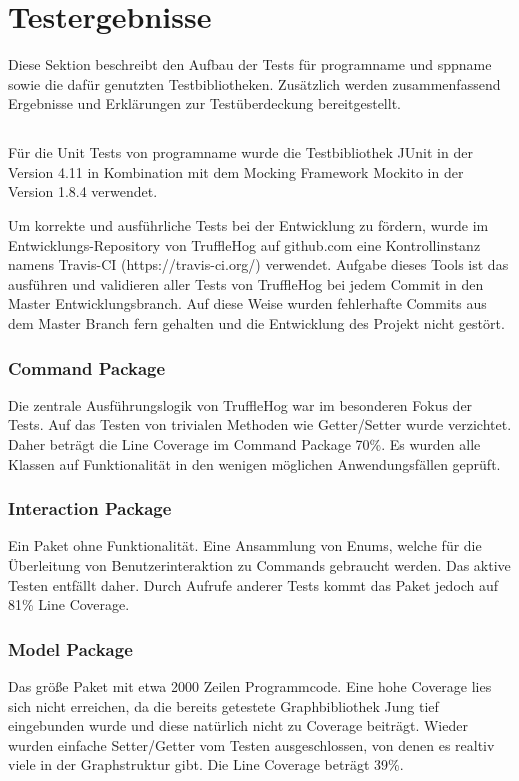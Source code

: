 \chapter{Testergebnisse}

Diese Sektion beschreibt den Aufbau der Tests für \gls{programname} und \gls{sppname} sowie die dafür genutzten Testbibliotheken. Zusätzlich werden zusammenfassend Ergebnisse und Erklärungen zur Testüberdeckung bereitgestellt.

\section{\programname}

Für die Unit Tests von \gls{programname} wurde die Testbibliothek JUnit in der Version 4.11 in Kombination mit dem Mocking Framework Mockito in der Version 1.8.4 verwendet.

Um korrekte und ausführliche Tests bei der Entwicklung zu fördern, wurde im Entwicklungs-Repository von TruffleHog auf github.com eine Kontrollinstanz namens Travis-CI (https://travis-ci.org/) verwendet. Aufgabe dieses Tools ist das ausführen und validieren aller Tests von TruffleHog bei jedem Commit in den Master Entwicklungsbranch. Auf diese Weise wurden fehlerhafte Commits aus dem Master Branch fern gehalten und die Entwicklung des Projekt nicht gestört.

\subsection{Command Package}

Die zentrale Ausführungslogik von TruffleHog war im besonderen Fokus der Tests. Auf das Testen von trivialen Methoden wie Getter/Setter wurde verzichtet. Daher beträgt die Line Coverage im Command Package  70\%. Es wurden alle Klassen auf Funktionalität in den wenigen möglichen Anwendungsfällen geprüft.

\subsection{Interaction Package}
Ein Paket ohne Funktionalität. Eine Ansammlung von Enums, welche für die Überleitung von Benutzerinteraktion zu Commands gebraucht werden. Das aktive Testen entfällt daher. Durch Aufrufe anderer Tests kommt das Paket jedoch auf 81\% Line Coverage.

\subsection{Model Package}
Das größe Paket mit etwa 2000 Zeilen Programmcode. Eine hohe Coverage lies sich nicht erreichen, da die bereits getestete Graphbibliothek Jung tief eingebunden wurde und diese natürlich nicht zu Coverage beiträgt. Wieder wurden einfache Setter/Getter vom Testen ausgeschlossen, von denen es realtiv viele in der Graphstruktur gibt. Die Line Coverage beträgt 39\%.

